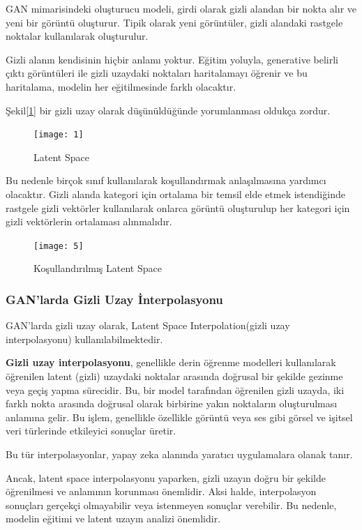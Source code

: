 \documentclass[12pt, a4paper]{article}
\begin{document}
	GAN mimarisindeki oluşturucu modeli, girdi olarak gizli alandan bir nokta alır ve yeni bir görüntü oluşturur. Tipik olarak yeni görüntüler, gizli alandaki rastgele noktalar kullanılarak oluşturulur.	
	
	Gizli alanın kendisinin hiçbir anlamı yoktur. 
	Eğitim yoluyla, generative belirli çıktı görüntüleri ile gizli uzaydaki noktaları haritalamayı öğrenir ve bu haritalama, modelin her eğitilmesinde farklı olacaktır.
	
	Şekil\eqref{1} bir gizli uzay olarak düşünüldüğünde yorumlanması oldukça zordur.
	
	\begin{figure}[h]
		\centering
		\texttt{[image: 1]}
		\caption{Latent Space\cite{ganlatent}}		
		\label{1}
	\end{figure}
	\FloatBarrier
	Bu nedenle birçok sınıf kullanılarak koşullandırmak anlaşılmasına yardımcı olacaktır.
	Gizli alanda kategori için ortalama bir temsil elde etmek istendiğinde rastgele gizli vektörler kullanılarak onlarca görüntü oluşturulup her kategori için gizli vektörlerin ortalaması alınmalıdır.  
	
	\begin{figure}[h]
		\centering
		\texttt{[image: 5]}
		\label{5}
		\caption{Koşullandırılmış Latent Space\cite{ganlatent}}
	\end{figure}
	\FloatBarrier
	\subsubsection{GAN'larda Gizli Uzay İnterpolasyonu}
	GAN'larda gizli uzay olarak, Latent Space Interpolation(gizli uzay interpolasyonu) kullanılabilmektedir.
	
	\textbf{Gizli uzay interpolasyonu}, genellikle derin öğrenme modelleri kullanılarak öğrenilen latent (gizli) uzaydaki noktalar arasında doğrusal bir şekilde gezinme veya geçiş yapma sürecidir. Bu, bir model tarafından öğrenilen gizli uzayda, iki farklı nokta arasında doğrusal olarak birbirine yakın noktaların oluşturulması anlamına gelir. Bu işlem, genellikle özellikle görüntü veya ses gibi görsel ve işitsel veri türlerinde etkileyici sonuçlar üretir.
	
	Bu tür interpolasyonlar, yapay zeka alanında yaratıcı uygulamalara olanak tanır. 
	
	Ancak, latent space interpolasyonu yaparken, gizli uzayın doğru bir şekilde öğrenilmesi ve anlamının korunması önemlidir. Aksi halde, interpolasyon sonuçları gerçekçi olmayabilir veya istenmeyen sonuçlar verebilir. Bu nedenle, modelin eğitimi ve latent uzayın analizi önemlidir.
	
\end{document}
